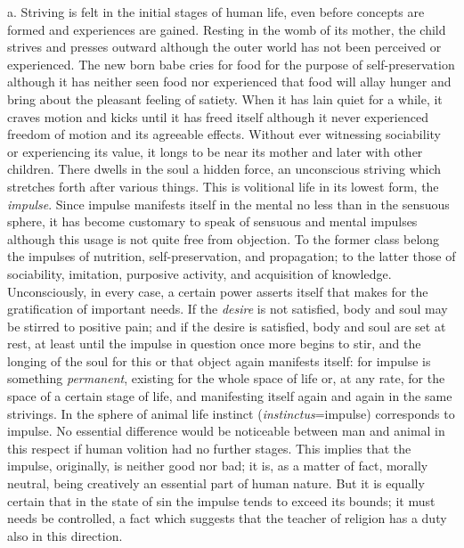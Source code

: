 a. Striving is felt in the initial stages of human life, even before concepts are formed and experiences are gained. Resting in the womb of its mother, the child strives and presses outward although the outer world has not been perceived or experienced. The new born babe cries for food for the purpose of self-preservation although it has neither seen food nor experienced that food will allay hunger and bring about the pleasant feeling of satiety. When it has lain quiet for a while, it craves motion and kicks until it has freed itself although it never experienced freedom of motion and its agreeable effects. Without ever witnessing sociability or experiencing its value, it longs to be near its mother and later with other children. There dwells in the soul a hidden force, an unconscious striving which stretches forth after various things. This is volitional
life in its lowest form, the \emph{impulse}. Since impulse manifests itself in the mental no less than in the sensuous sphere, it has become customary to speak of sensuous and mental impulses although this usage is not quite free from objection. To the former class belong the impulses of nutrition, self-preservation, and propagation; to the latter those of sociability, imitation, purposive activity, and acquisition of knowledge. Unconsciously, in every case, a certain power asserts itself that makes for the gratification of important needs. If the \emph{desire} is not satisfied, body and soul may be stirred to positive pain; and if the desire is satisfied, body and soul are set at rest, at least until the impulse in question once more begins to stir, and the longing of the soul for this or that object again manifests itself: for impulse is something \emph{permanent}, existing for the whole space of life or, at any rate, for the space of a certain stage of life, and manifesting itself again and again in the same strivings. In the sphere of animal life instinct (\emph{instinctus}=impulse) corresponds to impulse. No essential difference would be noticeable between man and animal in this respect if human volition had no further stages. This implies that the impulse, originally, is neither good nor bad; it is, as a matter of fact, morally neutral, being creatively an essential part of human nature. But it is equally certain that in the state of sin the impulse tends to exceed its bounds; it must needs be controlled, a fact which suggests that the teacher of religion has a duty also in this direction.

